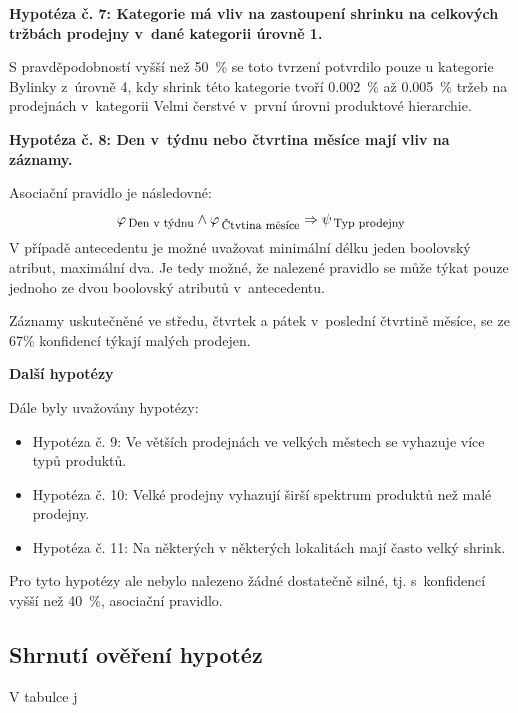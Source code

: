 \vspace*{1em}

\textbf{Hypotéza č. 7: Kategorie má vliv na zastoupení shrinku na celkových tržbách prodejny v~dané kategorii úrovně 1.}

S pravděpodobností vyšší než 50~\% se toto tvrzení potvrdilo pouze u kategorie Bylinky z~úrovně 4, kdy shrink této kategorie tvoří 0.002~\% až 0.005~\% tržeb na prodejnách v~kategorii Velmi čerstvé v~první úrovni produktové hierarchie.

\vspace*{1em}

\textbf{Hypotéza č. 8: Den v~týdnu nebo čtvrtina měsíce mají vliv na záznamy.}

Asociační pravidlo je následovné:
\begin{equation}
    \varphi_{\mbox{\,{\footnotesize Den v týdnu}}} \land  \varphi_{\mbox{\,{\footnotesize Čtvtina měsíce}}} \Rightarrow \psi_{\mbox{\,{\footnotesize Typ prodejny}}}
\end{equation} 
V případě antecedentu je možné uvažovat minimální délku jeden boolovský atribut, maximální dva. Je tedy možné, že nalezené pravidlo se může týkat pouze jednoho ze dvou boolovský atributů v~antecedentu.

Záznamy uskutečněné ve středu, čtvrtek a pátek v~poslední čtvrtině měsíce, se ze 67\% konfidencí týkají malých prodejen.



\textbf{Další hypotézy}

Dále byly uvažovány hypotézy:
\begin{itemize}
    \itemsep 0em
    \item Hypotéza č. 9: Ve větších prodejnách ve velkých městech se vyhazuje více typů produktů.
    \item Hypotéza č. 10: Velké prodejny vyhazují širší spektrum produktů než malé prodejny.
    \item Hypotéza č. 11: Na některých v některých lokalitách mají často velký shrink.
\end{itemize}

Pro tyto hypotézy ale nebylo nalezeno žádné dostatečně silné, tj. s~konfidencí vyšší než 40~\%, asociační pravidlo.

\subsection*{Shrnutí ověření hypotéz}

V tabulce j

